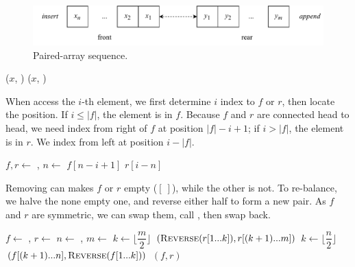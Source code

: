 \documentclass[b5paper]{article}
\begin{document}
\begin{figure}[htbp]
  \centering
  \includegraphics[scale=0.7]{img/parrays}
  \caption{Paired-array sequence.}
  \label{fig:parrays}
\end{figure}

\begin{algorithmic}[1]
  \State {}($x$, )
\EndFunction
{}
  \State {}($x$, )
\EndFunction
\end{algorithmic}


When access the $i$-th element, we first determine $i$ index to $f$ or $r$, then locate the position. If $ i \leq |f|$, the element is in $f$. Because $f$ and $r$ are connected head to head, we need index from right of $f$ at position $|f| - i + 1$; if $i > |f|$, the element is in $r$. We index from left at position $i - |f|$.

\begin{algorithmic}[1]
  \State $f, r \gets $ , 
  \State $n \gets $ 
    \State \Return $f[n - i + 1]$ 
  \Else
    \State \Return $r[i - n]$
  \EndIf
\EndFunction
\end{algorithmic}

Removing can makes $f$ or $r$ empty ($[\ ]$), while the other is not. To re-balance, we halve the none empty one, and reverse either half to form a new pair. As $f$ and $r$ are symmetric, we can swap them, call , then swap back.

\begin{algorithmic}[1]
  \State $f \gets$ , $r \gets$ 
  \State $n \gets$ , $m \gets$ 
    \State $k \gets \lfloor \dfrac{m}{2} \rfloor$
    \State \Return $(\textproc{Reverse}(r[1 ... k]), r[(k + 1) ... m])$
  \EndIf
    \State $k \gets \lfloor \dfrac{n}{2} \rfloor$
    \State \Return $(f[(k + 1) ... n], \textproc{Reverse}(f[1 ... k]))$
  \EndIf
  \State \Return $(f, r)$
\EndFunction
\end{algorithmic}
\end{document}
